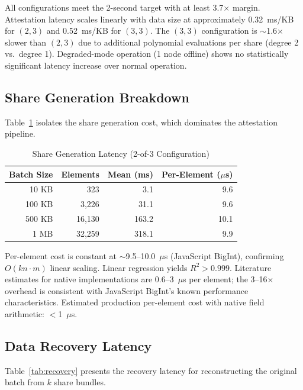All configurations meet the 2-second target with at least 3.7$\times$ margin.
Attestation latency scales linearly with data size at approximately
0.32~ms/KB for $(2,3)$ and 0.52~ms/KB for $(3,3)$. The $(3,3)$ configuration
is $\sim$1.6$\times$ slower than $(2,3)$ due to additional polynomial
evaluations per share (degree 2 vs.\ degree 1). Degraded-mode operation (1
node offline) shows no statistically significant latency increase over
normal operation.

\subsection{Share Generation Breakdown}

Table~\ref{tab:sharegen} isolates the share generation cost, which dominates
the attestation pipeline.

\begin{table}[h]
\centering
\caption{Share Generation Latency (2-of-3 Configuration)}
\label{tab:sharegen}
\begin{tabular}{rrrr}
\toprule
\textbf{Batch Size} & \textbf{Elements} & \textbf{Mean (ms)} &
\textbf{Per-Element ($\mu$s)} \\
\midrule
10 KB  & 323    & 3.1   & 9.6  \\
100 KB & 3,226  & 31.1  & 9.6  \\
500 KB & 16,130 & 163.2 & 10.1 \\
1 MB   & 32,259 & 318.1 & 9.9  \\
\bottomrule
\end{tabular}
\end{table}

Per-element cost is constant at $\sim$9.5--10.0~$\mu$s (JavaScript BigInt),
confirming $O(kn \cdot m)$ linear scaling. Linear regression yields
$R^2 > 0.999$. Literature estimates for native implementations are
0.6--3~$\mu$s per element; the 3--16$\times$ overhead is consistent with
JavaScript BigInt's known performance characteristics. Estimated production
per-element cost with native field arithmetic: $<$1~$\mu$s.

\subsection{Data Recovery Latency}

Table~\ref{tab:recovery} presents the recovery latency for reconstructing
the original batch from $k$ share bundles.

